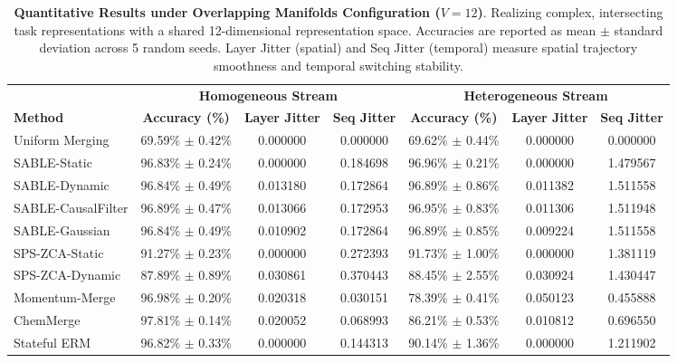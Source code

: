 \begin{table}[t]
\caption{\textbf{Quantitative Results under Overlapping Manifolds Configuration ($V = 12$)}. Realizing complex, intersecting task representations with a shared 12-dimensional representation space. Accuracies are reported as mean $\pm$ standard deviation across 5 random seeds. Layer Jitter (spatial) and Seq Jitter (temporal) measure spatial trajectory smoothness and temporal switching stability.}
\label{tab:overlapping_results}
\vskip 0.15in
\begin{center}
\setlength{\tabcolsep}{4.0pt}
\begin{small}
\begin{sc}
\begin{tabular}{lcccccc}
\toprule
 & \multicolumn{3}{c}{\textbf{Homogeneous Stream}} & \multicolumn{3}{c}{\textbf{Heterogeneous Stream}} \\
\cmidrule(r){2-4} \cmidrule(l){5-7}
\textbf{Method} & \textbf{Accuracy (\%)} & \textbf{Layer Jitter} & \textbf{Seq Jitter} & \textbf{Accuracy (\%)} & \textbf{Layer Jitter} & \textbf{Seq Jitter} \\
\midrule
Uniform Merging   & 69.59\% $\pm$ 0.42\% & 0.000000 & 0.000000 & 69.62\% $\pm$ 0.44\% & 0.000000 & 0.000000 \\
SABLE-Static      & 96.83\% $\pm$ 0.24\% & 0.000000 & 0.184698 & 96.96\% $\pm$ 0.21\% & 0.000000 & 1.479567 \\
SABLE-Dynamic     & 96.84\% $\pm$ 0.49\% & 0.013180 & 0.172864 & 96.89\% $\pm$ 0.86\% & 0.011382 & 1.511558 \\
SABLE-CausalFilter & 96.89\% $\pm$ 0.47\% & 0.013066 & 0.172953 & 96.95\% $\pm$ 0.83\% & 0.011306 & 1.511948 \\
SABLE-Gaussian    & 96.84\% $\pm$ 0.49\% & 0.010902 & 0.172864 & 96.89\% $\pm$ 0.85\% & 0.009224 & 1.511558 \\
SPS-ZCA-Static    & 91.27\% $\pm$ 0.23\% & 0.000000 & 0.272393 & 91.73\% $\pm$ 1.00\% & 0.000000 & 1.381119 \\
SPS-ZCA-Dynamic   & 87.89\% $\pm$ 0.89\% & 0.030861 & 0.370443 & 88.45\% $\pm$ 2.55\% & 0.030924 & 1.430447 \\
Momentum-Merge    & 96.98\% $\pm$ 0.20\% & 0.020318 & 0.030151 & 78.39\% $\pm$ 0.41\% & 0.050123 & 0.455888 \\
ChemMerge         & 97.81\% $\pm$ 0.14\% & 0.020052 & 0.068993 & 86.21\% $\pm$ 0.53\% & 0.010812 & 0.696550 \\
Stateful ERM      & 96.82\% $\pm$ 0.33\% & 0.000000 & 0.144313 & 90.14\% $\pm$ 1.36\% & 0.000000 & 1.211902 \\

\end{tabular}
\end{sc}
\end{small}
\end{center}
\end{table}
